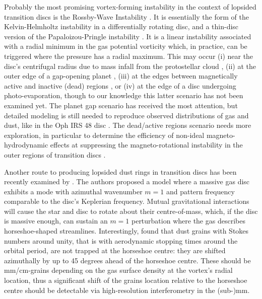 \documentclass[a4paper,usenatbib]{mnras}
\begin{document}
Probably the most promising vortex-forming instability in the context
of lopsided transition discs is the Rossby-Wave Instability
\citep[RWI,][]{lovelace99}. It is essentially the form of the
Kelvin-Helmholtz instability in a differentially rotating disc, and a
thin-disc version of the Papaloizou-Pringle instability
\citep{PP84}. It is a linear instability associated with a radial
minimum in the gas potential vorticity which, in practice, can be
triggered where the pressure has a radial maximum. This may occur (i)
near the disc's centrifugal radius due to mass infall from the
protostellar cloud \citep{Bae15}, (ii) at the outer edge of a
gap-opening planet \citep[e.g.,][]{Lyra09,LinMK12}, (iii) at the edges
between magnetically active and inactive (dead) regions
\citep[e.g.,][]{VT06,Regaly12,Faure14,Lyra15,Flock15}, or (iv) at the
edge of a disc undergoing photo-evaporation, though to our knowledge
this latter scenario has not been examined yet. The planet gap
scenario has received the most attention, but detailed modeling is
still needed to reproduce observed distributions of gas and dust, like
in the Oph IRS 48 disc \citep{ZhuStone14}. The dead/active regions
scenario needs more exploration, in particular to determine the
efficiency of non-ideal magneto-hydrodynamic effects at suppressing
the magneto-rotational instability in the outer regions of transition
discs \citep{Lesur14,Bai15,Gressel15}.

Another route to producing lopsided dust rings in transition discs has
been recently examined by \cite{MC15}. The authors proposed a model
where a massive gas disc exhibits a mode with azimuthal wavenumber
$m=1$ and pattern frequency comparable to the disc's Keplerian
frequency. Mutual gravitational interactions will cause the star and
disc to rotate about their centre-of-mass, which, if the disc is
massive enough, can sustain an $m=1$ perturbation where the gas
describes horseshoe-shaped streamlines. Interestingly, \cite{MC15}
found that dust grains with Stokes numbers around unity, that is with
aerodynamic stopping times around the orbital period, are not trapped
at the horseshoe centre: they are shifted azimuthally by up to 45
degrees ahead of the horseshoe centre. These should be mm/cm-grains
depending on the gas surface density at the vortex's radial location,
thus a significant shift of the grains location relative to the
horseshoe centre should be detectable via high-resolution
interferometry in the (sub-)mm.
\end{document}
